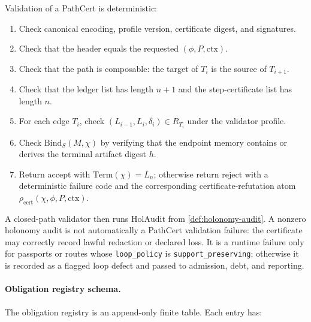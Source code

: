 \documentclass[11pt,twoside]{article}
\theoremstyle{definition}
\newcommand{\Bind}{\mathrm{Bind}}
\newcommand{\Term}{\mathrm{Term}}
\newcommand{\ctx}{\mathrm{ctx}}
\begin{document}
Validation of a PathCert is deterministic:
\begin{enumerate}[leftmargin=*]
  \item Check canonical encoding, profile version, certificate digest, and
        signatures.
  \item Check that the header equals the requested $(\phi,P,\ctx)$.
  \item Check that the path is composable: the target of $T_i$ is the source of
        $T_{i+1}$.
  \item Check that the ledger list has length $n+1$ and the step-certificate
        list has length $n$.
  \item For each edge $T_i$, check
        $(L_{i-1},L_i,\delta_i)\in R_{T_i}$ under the validator profile.
  \item Check $\Bind_S(M,\chi)$ by verifying that the endpoint memory contains
        or derives the terminal artifact digest $h$.
  \item Return accept with $\Term(\chi)=L_n$; otherwise return reject with a
        deterministic failure code and the corresponding certificate-refutation
        atom $\rho_{\mathrm{cert}}(\chi,\phi,P,\ctx)$.
\end{enumerate}
A closed-path validator then runs $\mathrm{HolAudit}$ from
\cref{def:holonomy-audit}. A nonzero holonomy audit is not automatically a
PathCert validation failure: the certificate may correctly record lawful
redaction or declared loss. It is a runtime failure only for passports or routes
whose \texttt{loop\_policy} is \texttt{support\_preserving}; otherwise it is
recorded as a flagged loop defect and passed to admission, debt, and reporting.

\paragraph{Obligation registry schema.}
The obligation registry is an append-only finite table. Each entry has:
\end{document}
